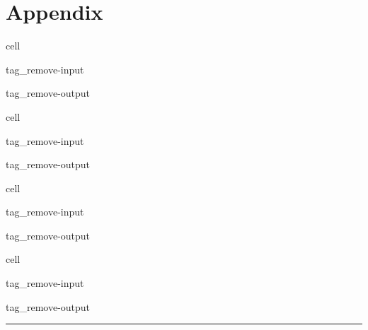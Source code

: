 \documentclass[letterpaper,10pt,english]{jupyterBook}
\begin{document}
\chapter{Appendix}
\label{\detokenize{ipynb/chapter4:appendix}}
\begin{sphinxuseclass}{cell}
\begin{sphinxuseclass}{tag_remove-input}
\begin{sphinxuseclass}{tag_remove-output}
\end{sphinxuseclass}
\end{sphinxuseclass}
\end{sphinxuseclass}
\begin{sphinxuseclass}{cell}
\begin{sphinxuseclass}{tag_remove-input}
\begin{sphinxuseclass}{tag_remove-output}
\end{sphinxuseclass}
\end{sphinxuseclass}
\end{sphinxuseclass}
\begin{sphinxuseclass}{cell}
\begin{sphinxuseclass}{tag_remove-input}
\begin{sphinxuseclass}{tag_remove-output}
\end{sphinxuseclass}
\end{sphinxuseclass}
\end{sphinxuseclass}
\begin{sphinxuseclass}{cell}
\begin{sphinxuseclass}{tag_remove-input}
\begin{sphinxuseclass}{tag_remove-output}
\end{sphinxuseclass}
\end{sphinxuseclass}
\end{sphinxuseclass}

\bigskip\hrule\bigskip








\renewcommand{\indexname}{Index}
\printindex
\end{document}
